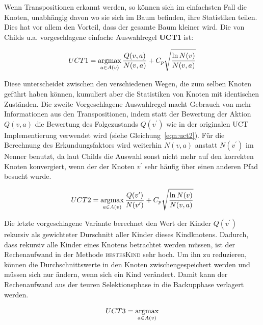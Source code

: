 Wenn Transpositionen erkannt werden, so können sich im einfachsten Fall die Knoten, unabhängig davon wo sie sich im Baum befinden, ihre Statistiken teilen. Dies hat vor allem den Vorteil, dass der gesamte Baum kleiner wird. Die von Childs u.a. vorgeschlagene einfache Auswahlregel \textbf{UCT1} ist:

\begin{equation}
UCT1 = \operatorname*{argmax}_{a \in A(v)} \frac{Q(v,a)}{N(v,a)} + C_p\sqrt{\frac{\ln N(v)}{N(v,a)}}
\label{eqn:UCT1}
\end{equation}

Diese unterscheidet zwischen den verschiedenen Wegen, die zum selben Knoten geführt haben können, kumuliert aber die Statistiken von Knoten mit identischen Zuständen. Die zweite Vorgeschlagene Auswahlregel macht Gebrauch von mehr Informationen aus den Transpositionen, indem statt der Bewertung der Aktion $Q(v,a)$ die Bewertung des Folgezustands $Q(v^\prime)$ wie in der originalen UCT Implementierung verwendet wird (siehe Gleichung~\ref{eqn:uct2}). Für die Berechnung des Erkundungsfaktors wird weiterhin $N(v,a)$ anstatt $N(v^\prime)$ im Nenner benutzt, da laut Childs die Auswahl sonst nicht mehr auf den korrekten Knoten konvergiert, wenn der der Knoten $v^\prime$ sehr häufig über einen anderen Pfad besucht wurde.

\begin{equation}
UCT2 = \operatorname*{argmax}_{a \in A(v)} \frac{Q(v^\prime)}{N(v^\prime)} + C_p\sqrt{\frac{\ln N(v)}{N(v,a)}}
\label{eqn:UCT2}
\end{equation}

Die letzte vorgeschlagene Variante berechnet den Wert der Kinder $Q(v^\prime)$ rekursiv als gewichteter Durschnitt aller Kinder dieses Kindknotens. Dadurch, dass rekursiv alle Kinder eines Knotens betrachtet werden müssen, ist der Rechenaufwand in der Methode \textsc{bestesKind} sehr hoch. Um ihn zu reduzieren, können die Durchschnittswerte in den Knoten zwischengespeichert werden und müssen sich nur ändern, wenn sich ein Kind verändert. Damit kann der Rechenaufwand aus der teuren Selektionsphase in die Backupphase verlagert werden.

\begin{equation}
UCT3 = \operatorname*{argmax}_{a \in A(v)}
\label{eqn:uct3}
\end{equation}

